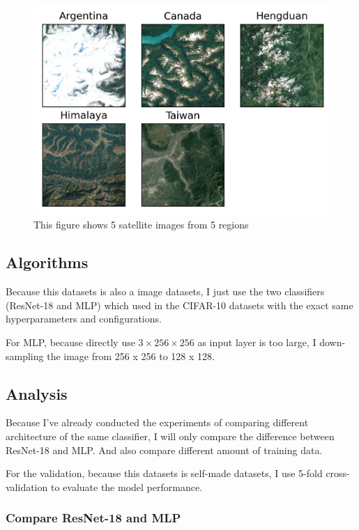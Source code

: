 \documentclass[twocolumn]{extarticle}
\begin{document}
\begin{figure}[H]
\centering
\includegraphics[width=0.9\linewidth]{figure/terrain_regions}
\caption{This figure shows 5 satellite images from 5 regions}
\label{fig:terrainregions}
\end{figure}

\subsection{Algorithms}

Because this datasets is also a image datasets, I just use the two classifiers (ResNet-18 and MLP) which used in the CIFAR-10 datasets with the exact same hyperparameters and configurations.

For MLP, because directly use $3 \times 256 \times 256$ as input layer is too large, I down-sampling the image from 256 x 256 to 128 x 128.

\subsection{Analysis}

Because I've already conducted the experiments of comparing different architecture of the same classifier, I will only compare the difference between ResNet-18 and MLP. And also compare different amount of training data.

For the validation, because this datasets is self-made datasets, I use 5-fold cross-validation to evaluate the model performance.

\subsubsection{Compare ResNet-18 and MLP}
\end{document}
